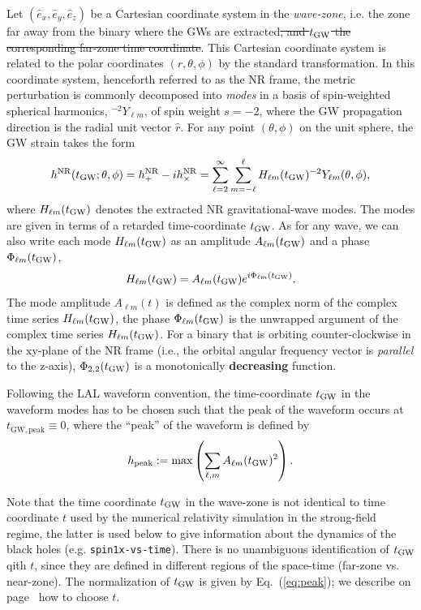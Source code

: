 \documentclass[11pt,tightenlines,article,amssymb,amsmath,amsfonts,superscriptaddress,nofootinbib]{revtex4}
\newcommand{\harald}[1]{\textcolor{Cerulean}{#1}}
\newcommand{\ExNR}{\hat e_x}
\newcommand{\EyNR}{\hat e_y}
\newcommand{\EzNR}{\hat e_z}
\newcommand{\tGW}{t_{\rm GW}}
\begin{document}
Let $( \ExNR, \EyNR, \EzNR)$ be a Cartesian coordinate system in the \emph{wave-zone}, i.e. the zone far away from the binary where the GWs are extracted\harald{\sout{, and $\tGW$ the corresponding far-zone time coordinate}}. This Cartesian coordinate system is related to the polar coordinates $(r, \theta, \phi)$ by the standard transformation. In this coordinate system, henceforth referred to as the NR frame, the metric perturbation is commonly decomposed into \emph{modes}
in a basis of spin-weighted spherical harmonics, ${}^{-2}Y_{\ell m}$, of spin weight $s=-2$, where the GW propagation direction is the radial unit vector $\hat{r}$.
For any point $(\theta, \phi)$ on the unit sphere, the GW strain takes the form
\begin{equation}
\label{ }
h^\mathrm{NR}(\tGW; \theta, \phi) = h^\mathrm{NR}_+ - i h^\mathrm{NR}_\times = \sum_{\ell=2}^\infty \sum_{m=-\ell}^{\ell} H_{\ell m}(\tGW) {}^{-2}Y_{\ell m}(\theta,\phi),
\end{equation}
where $H_{\ell m}(\tGW)$ denotes the extracted NR gravitational-wave modes.
\harald{The modes are given in terms of a retarded time-coordinate
  $t_{\rm GW}$}.
As for any wave, we can also write each mode $H_{\ell m}(\tGW)$ as an amplitude $A_{\ell m}(\tGW)$ and a phase
$\Phi_{\ell m}(\tGW)$,
\begin{equation}
\label{ }
H_{\ell m}(\tGW) = A_{\ell m}(\tGW)e^{i\Phi_{\ell m}(\tGW)}.
\end{equation}
The mode amplitude $A_{\ell m}(t)$ is defined as the complex norm of the complex time series $H_{\ell m}(\tGW)$, the phase $\Phi_{\ell m}(\tGW)$ is the unwrapped argument of the complex time series $H_{\ell m}(\tGW)$. For a binary that is orbiting counter-clockwise in the xy-plane of the NR frame (i.e., the orbital angular frequency vector is \emph{parallel} to the z-axis), $\Phi_{2,2}(\tGW)$ is a monotonically {\bf decreasing} function.

Following the LAL waveform convention, the time-coordinate $\tGW$ in the waveform modes has to be chosen such that the peak of the waveform occurs at $t_\mathrm{GW,peak} \equiv 0$, where the ``peak'' of the waveform is defined by
\begin{equation}
\label{eq:peak}
h_\mathrm{peak} := \max \left( \sum_{\ell, m} A_{\ell m}(\tGW)^2 \right).
\end{equation}

\harald{Note that the time coordinate $\tGW$ in the wave-zone is not
  identical to time coordinate $t$ used by the numerical
  relativity simulation in the strong-field regime, the latter is used
  below to give information about the dynamics of the black holes
  (e.g. {\tt spin1x-vs-time}).  There is no unambiguous identification
  of $t_{\rm GW}$ qith $t$, since they are defined in
  different regions of the space-time (far-zone vs. near-zone).  The
  normalization of $t_{\rm GW}$ is given by Eq.~(\ref{eq:peak}); we
  describe on page~\pageref{tGW-vs-tNR} how to choose $t$.}
 
\end{document}
